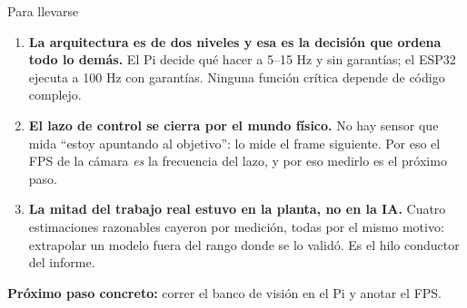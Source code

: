 \documentclass[aspectratio=169,10pt]{beamer}
\newcommand{\destaca}[1]{\textcolor{azul}{\textbf{#1}}}
\begin{document}
\begin{frame}{Para llevarse}
  \begin{enumerate}
    \item \destaca{La arquitectura es de dos niveles y esa es la decisión que
          ordena todo lo demás.} El Pi decide qué hacer a 5--15 Hz y sin
          garantías; el ESP32 ejecuta a 100 Hz con garantías. Ninguna función
          crítica depende de código complejo.

    \vspace{0.4em}
    \item \destaca{El lazo de control se cierra por el mundo físico.} No hay
          sensor que mida ``estoy apuntando al objetivo'': lo mide el frame
          siguiente. Por eso el FPS de la cámara \emph{es} la frecuencia del
          lazo, y por eso medirlo es el próximo paso.

    \vspace{0.4em}
    \item \destaca{La mitad del trabajo real estuvo en la planta, no en la IA.}
          Cuatro estimaciones razonables cayeron por medición, todas por el mismo
          motivo: extrapolar un modelo fuera del rango donde se lo validó. Es el
          hilo conductor del informe.
  \end{enumerate}

  \vspace{0.8em}
  {\centering\small
    \textbf{Próximo paso concreto:} correr el banco de visión en el Pi y anotar
    el FPS.\par}
\end{frame}
\end{document}
